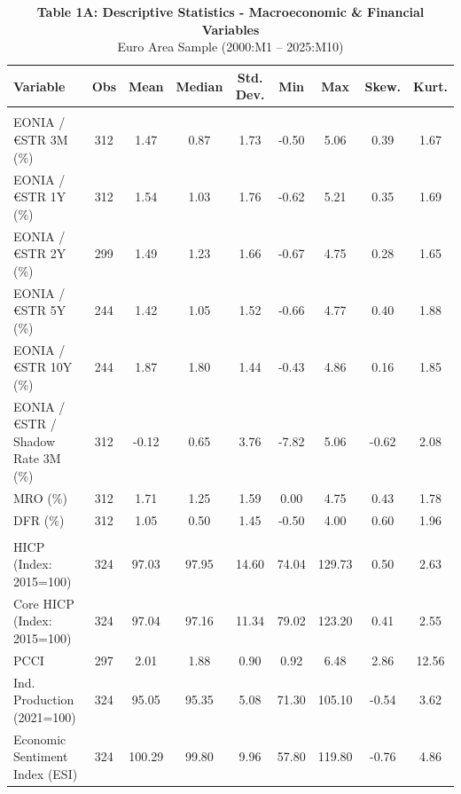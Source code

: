\begin{table}[t]
\caption*{
{\fontsize{12}{15}\selectfont  \textbf{Table 1A: Descriptive Statistics - Macroeconomic \& Financial Variables}\fontsize{12}{15}\selectfont } \\ 
{\fontsize{14}{17}\selectfont  Euro Area Sample (2000:M1 – 2025:M10)\fontsize{12}{15}\selectfont }
} 
\fontsize{12.0pt}{14.0pt}\selectfont
\begin{tabular*}{0.9\linewidth}{@{\extracolsep{\fill}}lcccccccc}
\toprule
Variable & Obs & Mean & Median & Std. Dev. & Min & Max & Skew. & Kurt. \\ 
\midrule\addlinespace[2.5pt]
\multicolumn{9}{>{\raggedright\arraybackslash}m{0.9\linewidth}}{\parbox{\linewidth}{Policy \& Interest Rates}} \\[2.5pt] 
\midrule\addlinespace[2.5pt]
EONIA / €STR 3M (\%) & 312 & 1.47 & 0.87 & 1.73 & -0.50 & 5.06 & 0.39 & 1.67 \\ 
EONIA / €STR 1Y (\%) & 312 & 1.54 & 1.03 & 1.76 & -0.62 & 5.21 & 0.35 & 1.69 \\ 
EONIA / €STR 2Y (\%) & 299 & 1.49 & 1.23 & 1.66 & -0.67 & 4.75 & 0.28 & 1.65 \\ 
EONIA / €STR 5Y (\%) & 244 & 1.42 & 1.05 & 1.52 & -0.66 & 4.77 & 0.40 & 1.88 \\ 
EONIA / €STR 10Y (\%) & 244 & 1.87 & 1.80 & 1.44 & -0.43 & 4.86 & 0.16 & 1.85 \\ 
EONIA / €STR / Shadow Rate 3M (\%) & 312 & -0.12 & 0.65 & 3.76 & -7.82 & 5.06 & -0.62 & 2.08 \\ 
MRO (\%) & 312 & 1.71 & 1.25 & 1.59 & 0.00 & 4.75 & 0.43 & 1.78 \\ 
DFR (\%) & 312 & 1.05 & 0.50 & 1.45 & -0.50 & 4.00 & 0.60 & 1.96 \\ 
\midrule\addlinespace[2.5pt]
\multicolumn{9}{>{\raggedright\arraybackslash}m{0.9\linewidth}}{\parbox{\linewidth}{Macroeconomic Fundamentals}} \\[2.5pt] 
\midrule\addlinespace[2.5pt]
HICP (Index: 2015=100) & 324 & 97.03 & 97.95 & 14.60 & 74.04 & 129.73 & 0.50 & 2.63 \\ 
Core HICP (Index: 2015=100) & 324 & 97.04 & 97.16 & 11.34 & 79.02 & 123.20 & 0.41 & 2.55 \\ 
PCCI & 297 & 2.01 & 1.88 & 0.90 & 0.92 & 6.48 & 2.86 & 12.56 \\ 
Ind. Production (2021=100) & 324 & 95.05 & 95.35 & 5.08 & 71.30 & 105.10 & -0.54 & 3.62 \\ 
Economic Sentiment Index (ESI) & 324 & 100.29 & 99.80 & 9.96 & 57.80 & 119.80 & -0.76 & 4.86 \\ 

\end{tabular*}
\end{table}
